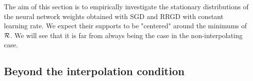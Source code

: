 \documentclass[article,authoryear,jmlmc]{beg_32}             %
\begin{document}
The aim of this section is to empirically investigate the stationary distributions of the neural network weights obtained with SGD and RRGD with constant learning rate. 
We expect their supports to be "centered" around the minimums of $\mathcal{R}$. We will see that it is far from always being the case in the non-interpolating case. 

\subsection{Beyond the interpolation condition}
\label{subsection_beyond_interpolation}

\end{document}
